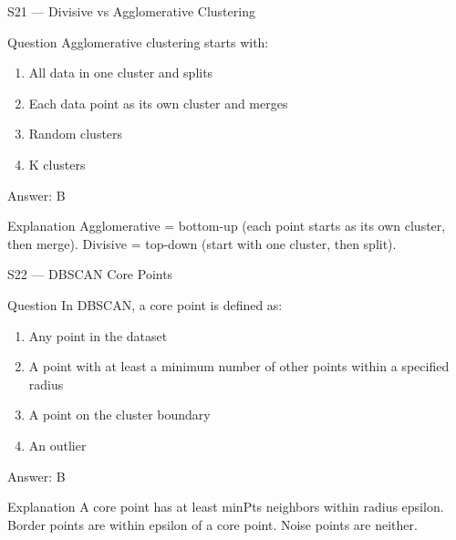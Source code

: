 \documentclass[aspectratio=169,8pt]{beamer}
\begin{document}
	\begin{frame}{S21 --- Divisive vs Agglomerative Clustering}
		\begin{block}{Question}
			Agglomerative clustering starts with:
			\begin{enumerate}
				\item All data in one cluster and splits
				\item Each data point as its own cluster and merges
				\item Random clusters
				\item K clusters
			\end{enumerate}
		\end{block}
		\begin{exampleblock}{Answer: B}\end{exampleblock}
		\begin{block}{Explanation}
			Agglomerative = bottom-up (each point starts as its own cluster, then merge). Divisive = top-down (start with one cluster, then split).
		\end{block}
	\end{frame}
	
	\begin{frame}{S22 --- DBSCAN Core Points}
		\begin{block}{Question}
			In DBSCAN, a core point is defined as:
			\begin{enumerate}
				\item Any point in the dataset
				\item A point with at least a minimum number of other points within a specified radius
				\item A point on the cluster boundary
				\item An outlier
			\end{enumerate}
		\end{block}
		\begin{exampleblock}{Answer: B}\end{exampleblock}
		\begin{block}{Explanation}
			A core point has at least minPts neighbors within radius epsilon. Border points are within epsilon of a core point. Noise points are neither.
		\end{block}
	\end{frame}
	
\end{document}
